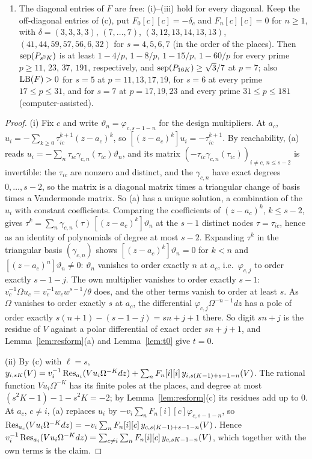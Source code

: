 \begin{theorem}
\begin{enumerate}
\item[(d)] The diagonal entries of $F$ are free: (i)--(iii) hold for every diagonal. Keep the off-diagonal entries of (c), put $F_0[c][c]=-\delta_c$ and $F_n[c][c]=0$ for $n\ge1$, with $\delta=(3,3,3,3)$, $(7,\dots,7)$, $(3,12,13,14,13,13)$, $(41,44,59,57,56,6,32)$ for $s=4,5,6,7$ (in the order of the places). Then $\operatorname{sep}(P_{s^2K})$ is at least $1-4/p$, $1-8/p$, $1-15/p$, $1-60/p$ for every prime $p\ge11$, $23$, $37$, $191$, respectively, and $\operatorname{sep}(P_{16K})\ge\sqrt3/7$ at $p=7$; also $\mathrm{LB}(F)>0$ for $s=5$ at $p=11,13,17,19$, for $s=6$ at every prime $17\le p\le31$, and for $s=7$ at $p=17,19,23$ and every prime $31\le p\le181$ (computer-assisted).
\end{enumerate}
\end{theorem}

\begin{proof}
(i) Fix $c$ and write $\vartheta_n=\varphi_{c,s-1-n}$ for the design multipliers. At $a_c$, $u_i=-\sum_{k\ge0}\tau_{ic}^{k+1}(z-a_c)^k$, so $[(z-a_c)^k]u_i=-\tau_{ic}^{k+1}$. By reachability, (a) reads $u_i=-\sum_n\tau_{ic}\gamma_{c,n}(\tau_{ic})\vartheta_n$, and its matrix $(-\tau_{ic}\gamma_{c,n}(\tau_{ic}))_{i\ne c,\,n\le s-2}$ is invertible: the $\tau_{ic}$ are nonzero and distinct, and the $\gamma_{c,n}$ have exact degrees $0,\dots,s-2$, so the matrix is a diagonal matrix times a triangular change of basis times a Vandermonde matrix. So (a) has a unique solution, a combination of the $u_i$ with constant coefficients. Comparing the coefficients of $(z-a_c)^k$, $k\le s-2$, gives $\tau^k=\sum_n\gamma_{c,n}(\tau)\,[(z-a_c)^k]\vartheta_n$ at the $s-1$ distinct nodes $\tau=\tau_{ic}$, hence as an identity of polynomials of degree at most $s-2$. Expanding $\tau^k$ in the triangular basis $(\gamma_{c,n})$ shows $[(z-a_c)^k]\vartheta_n=0$ for $k<n$ and $[(z-a_c)^n]\vartheta_n\ne0$: $\vartheta_n$ vanishes to order exactly $n$ at $a_c$, i.e.\ $\varphi_{c,j}$ to order exactly $s-1-j$. The own multiplier vanishes to order exactly $s-1$: $v_c^{-1}\Omega u_c=v_c^{-1}w_cw^{s-1}/\theta$ does, and the other terms vanish to order at least $s$. As $\Omega$ vanishes to order exactly $s$ at $a_c$, the differential $\varphi_{c,j}\Omega^{-n-1}dz$ has a pole of order exactly $s(n+1)-(s-1-j)=sn+j+1$ there. So digit $sn+j$ is the residue of $V$ against a polar differential of exact order $sn+j+1$, and Lemma~\ref{lem:resform}(a) and Lemma~\ref{lem:t0} give $t=0$.

(ii) By (c) with $\ell=s$, $y_{i,sK}(V)=v_i^{-1}\operatorname{Res}_{a_i}(Vu_i\Omega^{-K}dz)+\sum_nF_n[i][i]\,y_{i,s(K-1)+s-1-n}(V)$. The rational function $Vu_i\Omega^{-K}$ has its finite poles at the places, and degree at most $(s^2K-1)-1-s^2K=-2$; by Lemma~\ref{lem:resform}(c) its residues add up to $0$. At $a_c$, $c\ne i$, (a) replaces $u_i$ by $-v_i\sum_nF_n[i][c]\varphi_{c,s-1-n}$, so $\operatorname{Res}_{a_c}(Vu_i\Omega^{-K}dz)=-v_i\sum_nF_n[i][c]\,y_{c,s(K-1)+s-1-n}(V)$. Hence $v_i^{-1}\operatorname{Res}_{a_i}(Vu_i\Omega^{-K}dz)=\sum_{c\ne i}\sum_nF_n[i][c]\,y_{c,sK-1-n}(V)$, which together with the own terms is the claim.


\end{proof}
